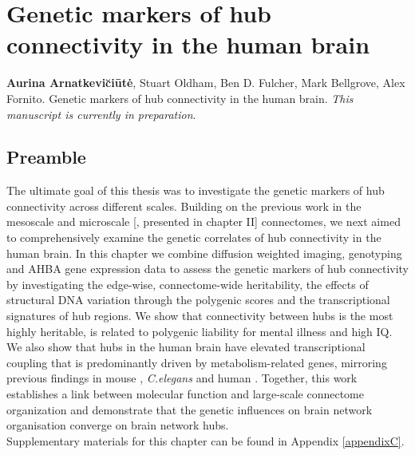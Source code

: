 \chapter{Genetic markers of hub connectivity in the human brain}
\label{ch:Chapter5}

\textbf{Aurina Arnatkevi\u{c}i\={u}t\.{e}},
Stuart Oldham,
Ben D. Fulcher,
Mark Bellgrove,
Alex Fornito.
Genetic markers of hub connectivity in the human brain. \textit{This manuscript is currently in preparation}.\\

\section*{Preamble}
The ultimate goal of this thesis was to investigate the genetic markers of hub connectivity across different scales. Building on the previous work in the mesoscale \citep{Fulcher2016} and microscale [\citep{Arnatkeviciute2018}, presented in chapter II] connectomes, we next aimed to comprehensively examine the genetic correlates of hub connectivity in the human brain. In this chapter we combine diffusion weighted imaging, genotyping and AHBA gene expression data to assess the genetic markers of hub connectivity by investigating the edge-wise, connectome-wide heritability, the effects of structural DNA variation through the polygenic scores and the transcriptional signatures of hub regions. We show that connectivity between hubs is the most highly heritable, is related to polygenic liability for mental illness and high IQ. We also show that hubs in the human brain have elevated transcriptional coupling that is predominantly driven by metabolism-related genes, mirroring previous findings in mouse \citep{Fulcher2016}, \textit{C.elegans} \citep{Arnatkeviciute2018} and human \citep{Vertes2016b}. Together, this work establishes a link between molecular function and large-scale connectome organization and demonstrate that the genetic influences on brain network organisation converge on brain network hubs.\\
Supplementary materials for this chapter can be found in Appendix \ref{appendixC}.

\newpage

